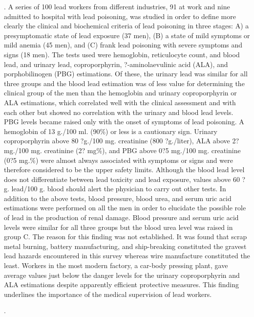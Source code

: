\documentclass{article}
\begin{document}
\medskip
{}. A series of 100 lead workers from different industries, 91 at work and nine admitted to hospital with lead poisoning, was studied in order to define more clearly the clinical and biochemical criteria of lead poisoning in three stages: A) a presymptomatic state of lead exposure (37 men), (B) a state of mild symptoms or mild anemia (45 men), and (C) frank lead poisoning with severe symptoms and signs (18 men). The tests used were hemoglobin, reticulocyte count, and blood lead, and urinary lead, coproporphyrin, ?-aminolaevulinic acid (ALA), and porphobilinogen (PBG) estimations. Of these, the urinary lead was similar for all three groups and the blood lead estimation was of less value for determining the clinical group of the men than the hemoglobin and urinary coproporphyrin or ALA estimations, which correlated well with the clinical assessment and with each other but showed no correlation with the urinary and blood lead levels. PBG levels became raised only with the onset of symptoms of lead poisoning. A hemoglobin of 13 g./100 ml. (90\%) or less is a cautionary sign. Urinary coproporphyrin above 80 ?g./100 mg. creatinine (800 ?g./liter), ALA above 2? mg./100 mg. creatinine (2? mg\%), and PBG above 0?5 mg./100 mg. creatinine (0?5 mg.\%) were almost always associated with symptoms or signs and were therefore considered to be the upper safety limits. Although the blood lead level does not differentiate between lead toxicity and lead exposure, values above 60 ?g. lead/100 g. blood should alert the physician to carry out other tests. In addition to the above tests, blood pressure, blood urea, and serum uric acid estimations were performed on all the men in order to elucidate the possible role of lead in the production of renal damage. Blood pressure and serum uric acid levels were similar for all three groups but the blood urea level was raised in group C. The reason for this finding was not established. It was found that scrap metal burning, battery manufacturing, and ship-breaking constituted the gravest lead hazards encountered in this survey whereas wire manufacture constituted the least. Workers in the most modern factory, a car-body pressing plant, gave average values just below the danger levels for the urinary coproporphyrin and ALA estimations despite apparently efficient protective measures. This finding underlines the importance of the medical supervision of lead workers.

.

\medskip
\end{document}
